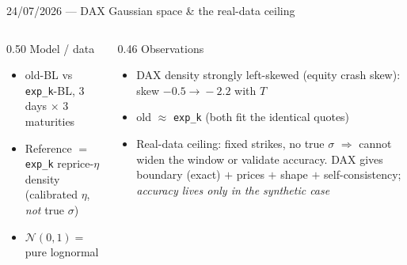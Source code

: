\documentclass[aspectratio=169,11pt]{beamer}
\newcommand{\gold}[1]{{\color{ntugold}#1}}
\newcommand{\red}[1]{{\color{ntured}#1}}
\begin{document}
\begin{frame}{24/07/2026 --- DAX Gaussian space \& the real-data ceiling}
  \begin{columns}[T]
    \begin{column}{0.50\linewidth}
      \gold{Model / data}
      \begin{itemize}\small
        \item old-BL vs \texttt{exp\_k}-BL, 3 days $\times$ 3 maturities
        \item Reference $=$ \texttt{exp\_k} reprice-$\eta$ density (calibrated $\eta$, \emph{not} true $\sigma$)
        \item $\mathcal N(0,1)=$ pure lognormal
      \end{itemize}
    \end{column}
    \begin{column}{0.46\linewidth}
      \gold{Observations}
      \begin{itemize}\small
        \item DAX density strongly \red{left-skewed} (equity crash skew): skew $-0.5\!\to\!-2.2$ with $T$
        \item old $\approx$ \texttt{exp\_k} (both fit the identical quotes)
        \item \red{Real-data ceiling:} fixed strikes, no true $\sigma$ $\Rightarrow$ cannot widen the window or validate accuracy. DAX gives boundary (exact) $+$ prices $+$ shape $+$ self-consistency; \emph{accuracy lives only in the synthetic case}
      \end{itemize}
    \end{column}
  \end{columns}
\end{frame}

\end{document}
